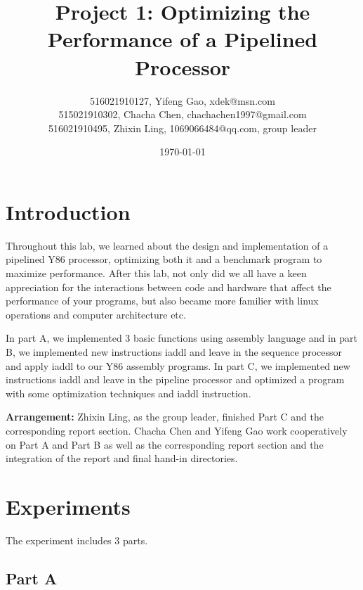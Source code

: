 \documentclass{article}
\title{\textbf{Project 1: Optimizing the Performance of a Pipelined Processor}} %
\author{
        516021910127, Yifeng Gao, xdek@msn.com \\
        515021910302, Chacha Chen, chachachen1997@gmail.com \\
        516021910495, Zhixin Ling, 1069066484@qq.com, group leader } %
\date{\today} %
\begin{document}
\maketitle %

\section{Introduction}

Throughout this lab, we learned about the design and implementation of a pipelined Y86 processor, optimizing both it and a benchmark program to maximize performance. After this lab, not only did we all have a keen appreciation for the interactions between code and hardware that affect the performance of your programs, but also became more familier with linux operations and computer architecture etc.

In part A, we implemented 3 basic functions using assembly language and in part B, we implemented new instructions iaddl and leave in the sequence processor and apply iaddl to our Y86 assembly programs. In part C, we implemented new instructions iaddl and leave in the pipeline processor and optimized a program with some optimization techniques and iaddl instruction.

\noindent\textbf{Arrangement:}
Zhixin Ling, as the group leader, finished Part C and the corresponding report section. Chacha Chen and Yifeng Gao work cooperatively on Part A and Part B as well as the corresponding report section and the integration of the report and final hand-in directories.


\section{Experiments}
The experiment includes 3 parts.

\subsection{Part A}
\end{document}
